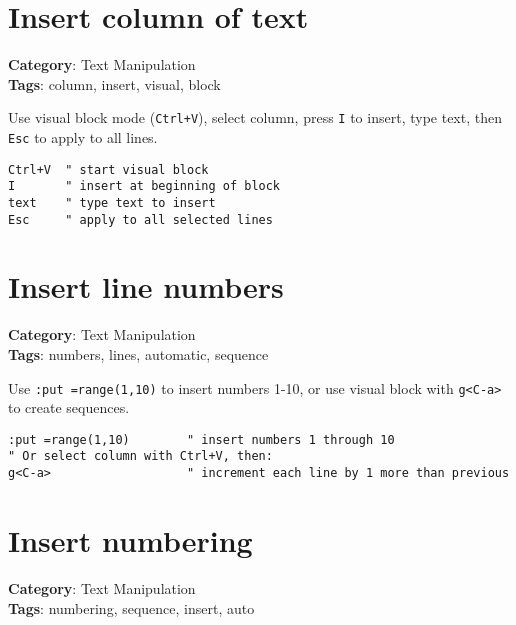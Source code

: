 {{{{{{{{{{{{{{\section{Insert column of text}

\textbf{Category}: Text Manipulation\\ \textbf{Tags}: column, insert, visual, block
\vspace{0.5cm}

Use visual block mode ({\footnotesize \Verb§Ctrl+V§}), select column, press {\footnotesize \Verb§I§} to insert, type text, then {\footnotesize \Verb§Esc§} to apply to all lines.

\begin{Exa*}{}
\begin{Verbatim}[fontsize=\footnotesize, breaklines, breakanywhere]
Ctrl+V  " start visual block
I       " insert at beginning of block
text    " type text to insert
Esc     " apply to all selected lines
\end{Verbatim}
\end{Exa*}

\section{Insert line numbers}

\textbf{Category}: Text Manipulation\\ \textbf{Tags}: numbers, lines, automatic, sequence
\vspace{0.5cm}

Use {\footnotesize \Verb§:put =range(1,10)§} to insert numbers 1-10, or use visual block with {\footnotesize \Verb§g<C-a>§} to create sequences.

\begin{Exa*}{}
\begin{Verbatim}[fontsize=\footnotesize, breaklines, breakanywhere]
:put =range(1,10)        " insert numbers 1 through 10
" Or select column with Ctrl+V, then:
g<C-a>                   " increment each line by 1 more than previous
\end{Verbatim}
\end{Exa*}

\section{Insert numbering}

\textbf{Category}: Text Manipulation\\ \textbf{Tags}: numbering, sequence, insert, auto
\vspace{0.5cm}

}}}}}}}}}}}}}}
